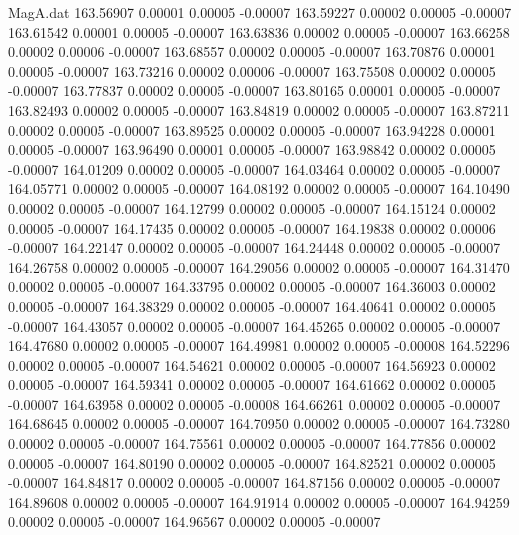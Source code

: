 \begin{filecontents}{MagA.dat}
 163.56907    0.00001    0.00005   -0.00007
 163.59227    0.00002    0.00005   -0.00007
 163.61542    0.00001    0.00005   -0.00007
 163.63836    0.00002    0.00005   -0.00007
 163.66258    0.00002    0.00006   -0.00007
 163.68557    0.00002    0.00005   -0.00007
 163.70876    0.00001    0.00005   -0.00007
 163.73216    0.00002    0.00006   -0.00007
 163.75508    0.00002    0.00005   -0.00007
 163.77837    0.00002    0.00005   -0.00007
 163.80165    0.00001    0.00005   -0.00007
 163.82493    0.00002    0.00005   -0.00007
 163.84819    0.00002    0.00005   -0.00007
 163.87211    0.00002    0.00005   -0.00007
 163.89525    0.00002    0.00005   -0.00007
 163.94228    0.00001    0.00005   -0.00007
 163.96490    0.00001    0.00005   -0.00007
 163.98842    0.00002    0.00005   -0.00007
 164.01209    0.00002    0.00005   -0.00007
 164.03464    0.00002    0.00005   -0.00007
 164.05771    0.00002    0.00005   -0.00007
 164.08192    0.00002    0.00005   -0.00007
 164.10490    0.00002    0.00005   -0.00007
 164.12799    0.00002    0.00005   -0.00007
 164.15124    0.00002    0.00005   -0.00007
 164.17435    0.00002    0.00005   -0.00007
 164.19838    0.00002    0.00006   -0.00007
 164.22147    0.00002    0.00005   -0.00007
 164.24448    0.00002    0.00005   -0.00007
 164.26758    0.00002    0.00005   -0.00007
 164.29056    0.00002    0.00005   -0.00007
 164.31470    0.00002    0.00005   -0.00007
 164.33795    0.00002    0.00005   -0.00007
 164.36003    0.00002    0.00005   -0.00007
 164.38329    0.00002    0.00005   -0.00007
 164.40641    0.00002    0.00005   -0.00007
 164.43057    0.00002    0.00005   -0.00007
 164.45265    0.00002    0.00005   -0.00007
 164.47680    0.00002    0.00005   -0.00007
 164.49981    0.00002    0.00005   -0.00008
 164.52296    0.00002    0.00005   -0.00007
 164.54621    0.00002    0.00005   -0.00007
 164.56923    0.00002    0.00005   -0.00007
 164.59341    0.00002    0.00005   -0.00007
 164.61662    0.00002    0.00005   -0.00007
 164.63958    0.00002    0.00005   -0.00008
 164.66261    0.00002    0.00005   -0.00007
 164.68645    0.00002    0.00005   -0.00007
 164.70950    0.00002    0.00005   -0.00007
 164.73280    0.00002    0.00005   -0.00007
 164.75561    0.00002    0.00005   -0.00007
 164.77856    0.00002    0.00005   -0.00007
 164.80190    0.00002    0.00005   -0.00007
 164.82521    0.00002    0.00005   -0.00007
 164.84817    0.00002    0.00005   -0.00007
 164.87156    0.00002    0.00005   -0.00007
 164.89608    0.00002    0.00005   -0.00007
 164.91914    0.00002    0.00005   -0.00007
 164.94259    0.00002    0.00005   -0.00007
 164.96567    0.00002    0.00005   -0.00007

\end{filecontents}
